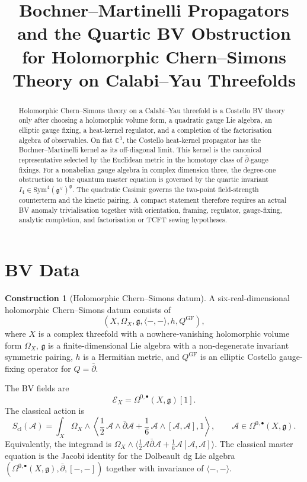 \documentclass[11pt]{amsart}
\title{Bochner--Martinelli Propagators and the Quartic BV Obstruction\\
for Holomorphic Chern--Simons Theory on Calabi--Yau Threefolds}
\author{}
\date{}
\providecommand{\C}{\mathbb{C}}
\providecommand{\dbar}{\bar{\partial}}
\providecommand{\gfrak}{\mathfrak{g}}
\providecommand{\Sym}{\mathrm{Sym}}
\providecommand{\cA}{\mathcal{A}}
\providecommand{\cE}{\mathcal{E}}
\theoremstyle{plain}
\theoremstyle{definition}
\newtheorem{construction}[theorem]{Construction}
\theoremstyle{remark}
\begin{document}
\maketitle

\begin{abstract}
Holomorphic Chern--Simons theory on a Calabi--Yau threefold is a
Costello BV theory only after choosing a holomorphic volume form, a
quadratic gauge Lie algebra, an elliptic gauge fixing, a heat-kernel
regulator, and a completion of the factorisation algebra of observables.
On flat $\C^3$, the Costello heat-kernel propagator has the
Bochner--Martinelli kernel as its off-diagonal limit. This kernel is the
canonical representative selected by the Euclidean metric in the
homotopy class of $\dbar$-gauge fixings. For a nonabelian gauge algebra
in complex dimension three, the degree-one obstruction to the quantum
master equation is governed by the quartic invariant
$I_4 \in \Sym^4(\gfrak^\vee)^{\gfrak}$. The quadratic Casimir governs
the two-point field-strength counterterm and the kinetic pairing. A
compact statement therefore requires an actual BV anomaly
trivialisation together with orientation, framing, regulator,
gauge-fixing, analytic completion, and factorisation or TCFT sewing
hypotheses.
\end{abstract}

\tableofcontents

\section{BV Data}
\label{sec:bv-data}

\begin{construction}[Holomorphic Chern--Simons datum]
\label{cons:hcs-datum}
A six-real-dimensional holomorphic Chern--Simons datum consists of
\[
  (X,\Omega_X,\gfrak,\langle -,-\rangle,h,Q^{\mathrm{GF}}),
\]
where $X$ is a complex threefold with a nowhere-vanishing holomorphic
volume form $\Omega_X$, $\gfrak$ is a finite-dimensional Lie algebra
with a non-degenerate invariant symmetric pairing, $h$ is a Hermitian
metric, and $Q^{\mathrm{GF}}$ is an elliptic Costello gauge-fixing
operator for $Q=\dbar$.

The BV fields are
\[
  \cE_X=\Omega^{0,\bullet}(X,\gfrak)[1].
\]
The classical action is
\[
S_{\mathrm{cl}}(\cA)=
  \int_X \Omega_X\wedge
  \left\langle
  \frac12\,\cA\wedge\dbar\cA+
  \frac16\,\cA\wedge[\cA,\cA],
  1
  \right\rangle ,
  \qquad
  \cA\in\Omega^{0,\bullet}(X,\gfrak).
\]
Equivalently, the integrand is
$\Omega_X\wedge\langle \frac12 \cA\dbar\cA+\frac16\cA[\cA,\cA]\rangle$.
The classical master equation is the Jacobi identity for the Dolbeault
dg Lie algebra
$(\Omega^{0,\bullet}(X,\gfrak),\dbar,[-,-])$
together with invariance of $\langle -,-\rangle$.
\end{construction}
\end{document}
